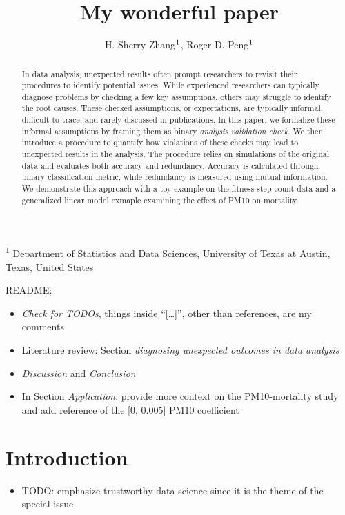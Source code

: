 \documentclass[
  12pt,
]{interact}
\title{My wonderful paper}
\author{H. Sherry Zhang$\textsuperscript{1}$, Roger D.
Peng$\textsuperscript{1}$}
\providecommand{\tightlist}{%
  \setlength{\itemsep}{0pt}\setlength{\parskip}{0pt}}\usepackage{longtable,booktabs,array}
\begin{document}
\captionsetup{labelsep=space}
\maketitle
\textsuperscript{1} Department of Statistics and Data
Sciences, University of Texas at Austin, Texas, United States
\begin{abstract}
In data analysis, unexpected results often prompt researchers to revisit
their procedures to identify potential issues. While experienced
researchers can typically diagnose problems by checking a few key
assumptions, others may struggle to identify the root causes. These
checked assumptions, or expectations, are typically informal, difficult
to trace, and rarely discussed in publications. In this paper, we
formalize these informal assumptions by framing them as binary
\emph{analysis validation check}. We then introduce a procedure to
quantify how violations of these checks may lead to unexpected results
in the analysis. The procedure relies on simulations of the original
data and evaluates both accuracy and redundancy. Accuracy is calculated
through binary classification metric, while redundancy is measured using
mutual information. We demonstrate this approach with a toy example on
the fitness step count data and a generalized linear model exmaple
examining the effect of PM10 on mortality.
\end{abstract}


README:

\begin{itemize}
\tightlist
\item
  \emph{Check for TODOs}, things inside ``{[}\ldots{]}'', other than
  references, are my comments
\item
  Literature review: Section \emph{diagnosing unexpected outcomes in
  data analysis}
\item
  \emph{Discussion} and \emph{Conclusion}
\item
  In Section \emph{Application}: provide more context on the
  PM10-mortality study and add reference of the {[}0, 0.005{]} PM10
  coefficient
\end{itemize}

\newpage

\section{Introduction}\label{introduction}

\begin{itemize}
\tightlist
\item
  TODO: emphasize trustworthy data science since it is the theme of the
  special issue
\end{itemize}
\end{document}

